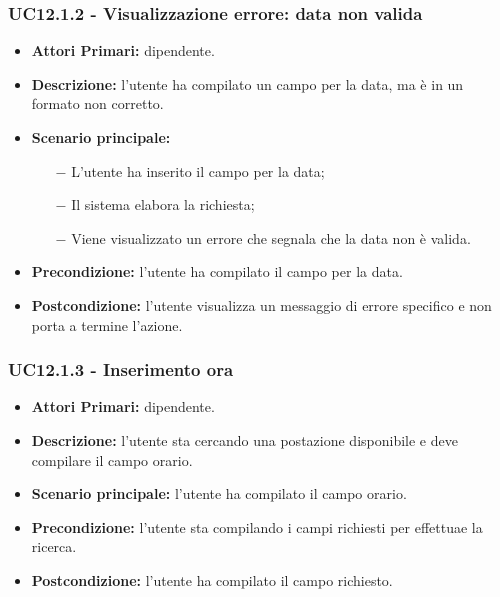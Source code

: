 \subsubsection{ UC12.1.2 - Visualizzazione errore: data non valida  }
\begin{itemize}
	\item\textbf{Attori Primari:} dipendente.
	\item\textbf{Descrizione:} l’utente ha compilato un campo per la data, ma è in un formato non corretto.
	\item\textbf{Scenario principale:} 
	\begin{itemize}
		\item[$-$] L’utente ha inserito il campo per la data;
		\item[$-$] Il sistema elabora la richiesta;
		\item[$-$] Viene visualizzato un errore che segnala che la data non è valida.
	\end{itemize}
	\item\textbf{Precondizione:} l’utente ha compilato il campo per la data.
	\item\textbf{Postcondizione:} l’utente visualizza un messaggio di errore specifico e non porta a termine l’azione.
\end{itemize}
\subsubsection{ UC12.1.3 - Inserimento ora }
\begin{itemize}
	\item\textbf{Attori Primari:} dipendente.
	\item\textbf{Descrizione:} l’utente sta cercando una postazione disponibile e deve compilare il campo orario.
	\item\textbf{Scenario principale:} l’utente ha compilato il campo orario.
	\item\textbf{Precondizione:} l’utente sta compilando i campi richiesti per effettuae la ricerca.
	\item\textbf{Postcondizione:} l’utente ha compilato il campo richiesto.
\end{itemize}
